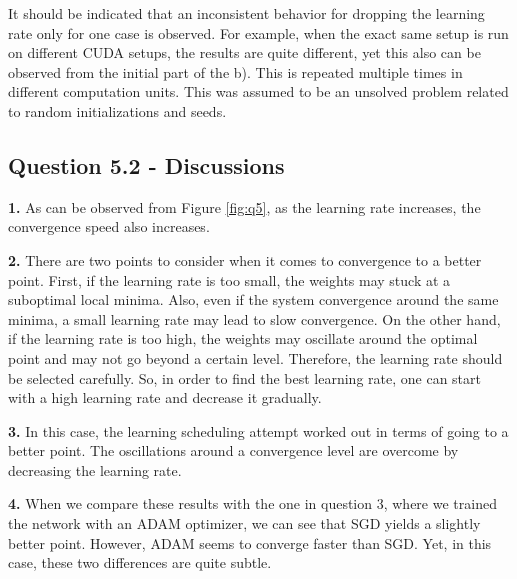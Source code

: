 \documentclass{assignment}
\begin{document}
\noindent It should be indicated that an inconsistent behavior for dropping the learning rate only for one case is observed. For example, when the exact same setup is run on different CUDA setups, the results are quite different, yet this also can be observed from the initial part of the b). This is repeated multiple times in different computation units. This was assumed to be an unsolved problem related to random initializations and seeds.

\subsection*{Question 5.2 - Discussions}

\textbf{1.}
\noindent As can be observed from Figure \ref{fig:q5}, as the learning rate increases, the convergence speed also increases.

\textbf{2.}
\noindent There are two points to consider when it comes to convergence to a better point. First, if the learning rate is too small, the weights may stuck at a suboptimal local minima. Also, even if the system convergence around the same minima, a small learning rate may lead to slow convergence. On the other hand, if the learning rate is too high, the weights may oscillate around the optimal point and may not go beyond a certain level. Therefore, the learning rate should be selected carefully. So, in order to find the best learning rate, one can start with a high learning rate and decrease it gradually. 

\textbf{3.}
\noindent In this case, the learning scheduling attempt worked out in terms of going to a better point. The oscillations around a convergence level are overcome by decreasing the learning rate. 

\textbf{4.}
\noindent When we compare these results with the one in question 3, where we trained the network with an ADAM optimizer, we can see that SGD yields a slightly better point. However, ADAM seems to converge faster than SGD. Yet, in this case, these two differences are quite subtle.
\nocite{*} 
\end{document}
